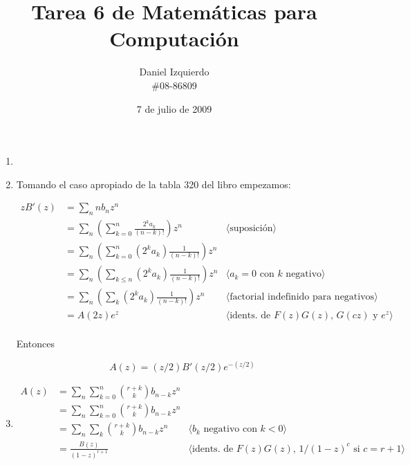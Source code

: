 \documentclass{article}
\begin{document}

\title{Tarea 6 de Matemáticas para Computación}
\author{Daniel Izquierdo \\ \#08-86809}
\date{7 de julio de 2009}

\maketitle

\section{}

\renewcommand{\labelenumi}{(\alph{enumi})}
\begin{enumerate}
 \item
 
 \item Tomando el caso apropiado de la tabla 320 del libro empezamos:

\begin{align*}
zB'(z) & = \sum_n n b_n z^n \\
       & = \sum_n \left( \sum_{k=0}^n \frac{2^k a_k}{(n-k)!} \right) z^n & \langle \text{suposición} \rangle \\
       & = \sum_n \left( \sum_{k=0}^n (2^k a_k) \frac{1}{(n-k)!} \right) z^n \\
       & = \sum_n \left( \sum_{k \leq n} (2^k a_k) \frac{1}{(n-k)!} \right) z^n
           & \langle a_k=0 \text{ con } k \text{ negativo}  \rangle \\
       & = \sum_n \left( \sum_{k} (2^k a_k) \frac{1}{(n-k)!} \right) z^n
           & \langle \text{factorial indefinido para negativos}  \rangle \\
       & = A(2z) e^z & \langle \text{idents. de } F(z)G(z) \text{, } G(cz) \text{ y } e^z \rangle \\
\end{align*}

Entonces

\[
A(z) = (z/2) B'(z/2) e^{-(z/2)}
\]

 \item 

\begin{align*}
A(z) & = \sum_n \sum_{k=0}^n \binom{r+k}{k} b_{n-k} z^n \\
     & = \sum_n \sum_{k=0}^n \binom{r+k}{k} b_{n-k} z^n \\
     & = \sum_n \sum_{k} \binom{r+k}{k} b_{n-k} z^n & \langle b_k \text{ negativo con } k < 0 \rangle \\
     & = \frac{B(z)}{(1-z)^{r+1}} & \langle \text{idents. de } F(z)G(z) \text{, } 1/(1-z)^c \text{ si } c=r+1 \rangle \\
\end{align*}


\end{enumerate}
\end{document}
